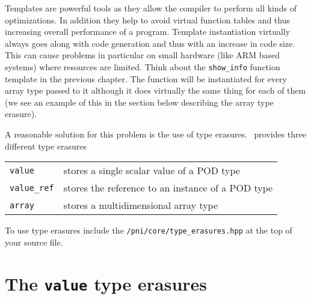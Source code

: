 
Templates are powerful tools as they allow the compiler to perform all kinds of
optimizations. In addition they help to avoid virtual function tables and thus
increasing overall performance of a program. 
Template instantiation virtually always goes along with code generation and thus
with an increase in code size. This can cause problems in particular on small
hardware (like ARM based systems) where resources are limited.
Think about the \texttt{show\_info} function template in the previous chapter. The
function will be instantiated for every array type passed to it although it does
virtually the same thing for each of them (we see an example of this in the
section below describing the array type erasure). 

A reasonable solution for this problem is the use of type erasures. 
\libpnicore\ provides three different type erasures
\begin{center}
\begin{tabular}{l | l}
\texttt{value} & stores a single scalar value of a POD type \\
\texttt{value\_ref} & stores the reference to an instance of a POD type \\
\texttt{array} & stores a multidimensional array type 
\end{tabular}
\end{center}
To use type erasures include the \texttt{/pni/core/type\_erasures.hpp} at the top of
your source file.

\section{The \texttt{value} type erasures}

